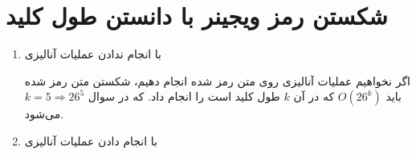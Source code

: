 \documentclass{article}
\begin{document}
\section{شکستن رمز ویجینر با دانستن طول کلید}
\begin{enumerate}
\item 
با انجام ندادن عملیات آنالیزی

اگر نخواهیم عملیات آنالیزی روی متن رمز شده انجام دهیم، 
شکستن متن رمز شده باید
$O(26^k)$
که در آن
$k$
طول کلید است را انجام داد. که در سوال
$k = 5 \Rightarrow 26^5$
می‌شود.
\item 
با انجام دادن عملیات آنالیزی

\end{enumerate}
\end{document}
